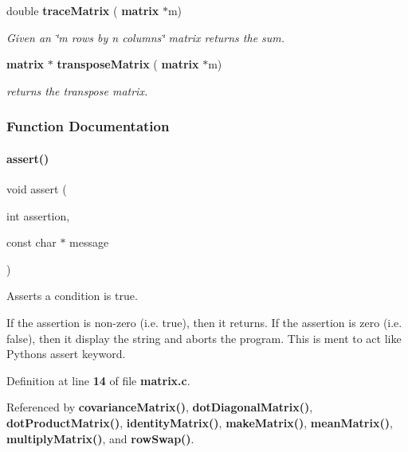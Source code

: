 \begin{DoxyCompactItemize}
double \textbf{ trace\+Matrix} (\textbf{ matrix} $\ast$m)
\begin{DoxyCompactList}\small\item\em Given an \char`\"{}m rows by n columns\char`\"{} matrix returns the sum. \end{DoxyCompactList}\item 
\textbf{ matrix} $\ast$ \textbf{ transpose\+Matrix} (\textbf{ matrix} $\ast$m)
\begin{DoxyCompactList}\small\item\em returns the transpose matrix. \end{DoxyCompactList}\end{DoxyCompactItemize}


\subsubsection{Function Documentation}
\mbox{\label{a00125_a8e41e30382335ea89f90b72db0b44d6f}} 
\paragraph{assert()}
{\footnotesize\ttfamily void assert (\begin{DoxyParamCaption}\item[{int}]{assertion,  }\item[{const char $\ast$}]{message }\end{DoxyParamCaption})}



Asserts a condition is true. 

If the assertion is non-\/zero (i.\+e. true), then it returns. If the assertion is zero (i.\+e. false), then it display the string and aborts the program. This is ment to act like Python\textquotesingle{}s assert keyword. 

Definition at line \textbf{ 14} of file \textbf{ matrix.\+c}.



Referenced by \textbf{ covariance\+Matrix()}, \textbf{ dot\+Diagonal\+Matrix()}, \textbf{ dot\+Product\+Matrix()}, \textbf{ identity\+Matrix()}, \textbf{ make\+Matrix()}, \textbf{ mean\+Matrix()}, \textbf{ multiply\+Matrix()}, and \textbf{ row\+Swap()}.


\mbox{\label{a00125_abbb8d2d20c2dd53a2269d017a336668f}} 
